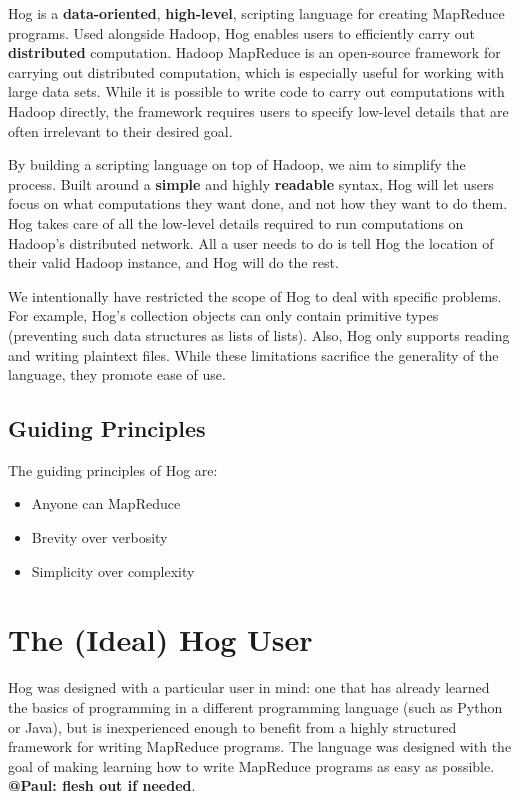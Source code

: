 \documentclass{book}
\begin{document}
Hog is a \textbf{data-oriented}, \textbf{high-level}, scripting language for
creating MapReduce programs. Used alongside Hadoop, Hog enables users to
efficiently carry out \textbf{distributed} computation. Hadoop MapReduce is an
open-source framework for carrying out distributed computation, which is especially
useful for working with large data sets. While it is possible to write code to
carry out computations with Hadoop directly, the framework requires users to
specify low-level details that are often irrelevant to their desired goal.

By building a scripting language on top of Hadoop, we aim to simplify the process.
Built around a \textbf{simple} and highly \textbf{readable} syntax, Hog will let
users focus on what computations they want done, and not how they want to do them.
Hog takes care of all the low-level details required to run computations on
Hadoop’s distributed network. All a user needs to do is tell Hog the location of
their valid Hadoop instance, and Hog will do the rest.

We intentionally have restricted the scope of Hog to deal with specific problems. For example, Hog's collection objects can
only contain primitive types (preventing such data structures as lists of lists). Also, Hog only supports reading and writing
plaintext files. While these limitations sacrifice the generality of the language, they promote ease of use.

\subsection{Guiding Principles} %
\label{sub:guiding_principles}

The guiding principles of Hog are:

\begin{itemize}
  \item Anyone can MapReduce
  \item Brevity over verbosity
  \item Simplicity over complexity
\end{itemize}



\section{The (Ideal) Hog User} %
\label{sec:the_ideal_hog_user}

Hog was designed with a particular user in mind: one that has already learned the basics of programming in a different
programming language (such as Python or Java), but is inexperienced enough to benefit from a highly structured framework for
writing MapReduce programs. The language was designed with the goal of making learning how to write MapReduce programs as easy
as possible. \textbf{@Paul: flesh out if needed}.
\end{document}
